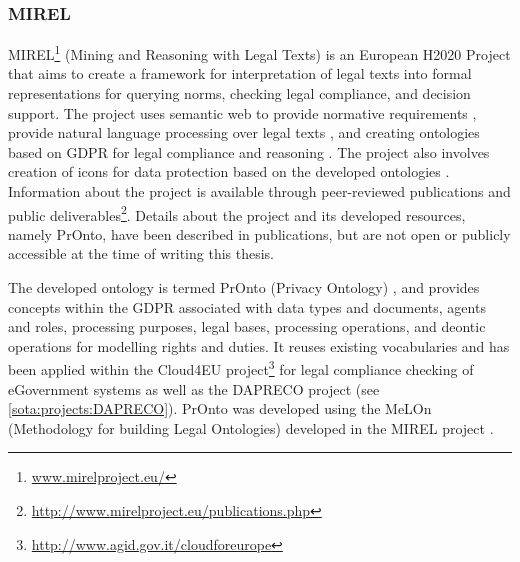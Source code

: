 \subsubsection{MIREL}\label{sec:sota:MIREL}
MIREL\footnote{\url{www.mirelproject.eu/}} (Mining and Reasoning with Legal Texts) is an European H2020 Project that aims to create a framework for interpretation of legal texts into formal representations for querying norms, checking legal compliance, and decision support. The project uses semantic web to provide normative requirements \cite{gandon_normative_2017}, provide natural language processing over legal texts \cite{milagro_teruel_legal_2018}, and creating ontologies based on GDPR \cite{monica_legal_2018} for legal compliance \cite{palmirani_pronto:_2018-1} and reasoning \cite{palmirani_pronto:_2018}. The project also involves creation of icons for data protection based on the developed ontologies \cite{arianna_dapis:_2019}.
Information about the project is available through peer-reviewed publications and public deliverables\footnote{\url{http://www.mirelproject.eu/publications.php}}.
Details about the project and its developed resources, namely PrOnto, have  been described in publications, but are not open or publicly accessible at the time of writing this thesis.

The developed ontology is termed PrOnto (Privacy Ontology) \cite{monica_legal_2018}, and provides concepts within the GDPR associated with data types and documents, agents and roles, processing purposes, legal bases, processing operations, and deontic operations for modelling rights and duties. It reuses existing vocabularies \cite{palmirani_pronto:_2018} and has been applied within the Cloud4EU project\footnote{\url{http://www.agid.gov.it/cloudforeurope}} for legal compliance checking of eGovernment systems as well as the DAPRECO project (see \autoref{sota:projects:DAPRECO}).
PrOnto was developed using the MeLOn (Methodology for building Legal Ontologies) developed in the MIREL project \cite{palmirani_pronto:_2018,palmirani_pronto:_2018-1,monica_modelling_2018}.

